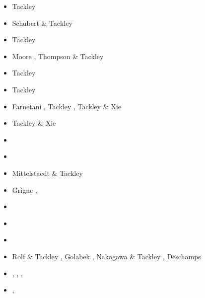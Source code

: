 \begin{itemize}
\begin{scriptsize}
\begin{itemize}
\item[\nineteenninetyfour] Tackley \cite{tackley94}
\item[\nineteenninetyfive] Schubert \& Tackley \cite{scta95}
\item[\nineteenninetysix] Tackley \cite{tack96,tack96b}
\item[\nineteenninetyeight] Moore \etal \cite{most98}, Thompson \& Tackley \cite{thta98}
\item[\twothousand] Tackley \cite{tack00,tack00b,tack00c,tack00d}
\item[\twothousandone] Tackley \cite{tack01}
\item[\twothousandtwo] Farnetani \etal \cite{falt02}, Tackley \cite{tack02}, 
                       Tackley \& Xie \cite{taxi02}
\item[\twothousandthree] Tackley \& Xie \cite{taxi03}
\item[\twothousandfour] \cite{xita04b}\cite{xita04}
                        \cite{nata04}\cite{nata04b}
                        \cite{nata04c}\cite{scmo04}\cite{yoog04}
\item[\twothousandfive] \cite{grlt05}\cite{fasa05}
                        \cite{nata05}\cite{nata05b}
                        \cite{nabu05}\cite{yoog05}
\item[\twothousandsix] Mittelstaedt \& Tackley \cite{mita06}
\item[\twothousandseven] Grigne \etal \cite{grlt07,grlt07b},
                         \cite{heta07}\cite{tanh07}
\item[\twothousandeight] \cite{deta08}\cite{hets08}
                         \cite{heta08}\cite{sata08}
                         \cite{nata08}\cite{tack08}\cite{vata08}
\item[\twothousandnine] \cite{deta09}\cite{natd09}\cite{keta09}
\item[\twothousandten] \cite{detn10}\cite{nata10}
                       \cite{moht10}\cite{sate10}\cite{natd10}
\item[\twothousandeleven] Rolf \& Tackley \cite{rota11}, Golabek \etal \cite{gokg11},
                          Nakagawa \& Tackley \cite{nata11}, Deschamps \etal \cite{dekt11}
\item[\twothousandtwelve] \cite{roct12}\cite{crtm12},
                          \cite{cosr13}\cite{deyt12},
                          \cite{dect12}\cite{arta12},
                          \cite{natd12}\cite{ullc12}
\item[\twothousandthirteen] \cite{ruts13}\cite{taab13},

\end{itemize}
\end{scriptsize}
\end{itemize}
